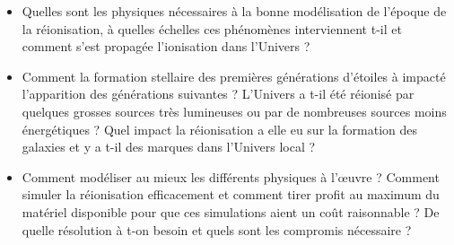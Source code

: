 %
%
%

\begin{itemize}
\item Quelles sont les physiques nécessaires à la bonne modélisation de l'époque de la réionisation, à quelles échelles ces phénomènes interviennent t-il et comment s'est propagée l'ionisation dans l'Univers ?
\item Comment la formation stellaire des premières générations d'étoiles à impacté l'apparition des générations suivantes ? 
L'Univers a t-il été réionisé par quelques grosses sources très lumineuses ou par de nombreuses sources moins énergétiques ?
Quel impact la réionisation a elle eu sur la formation des galaxies et y a t-il des marques dans l'Univers local ?
\item Comment modéliser au mieux les différents physiques à l’œuvre ?
Comment simuler la réionisation efficacement et comment tirer profit au maximum du matériel disponible pour que ces simulations aient un coût raisonnable ?
De quelle résolution à t-on besoin et quels sont les compromis nécessaire ?
\end{itemize}




